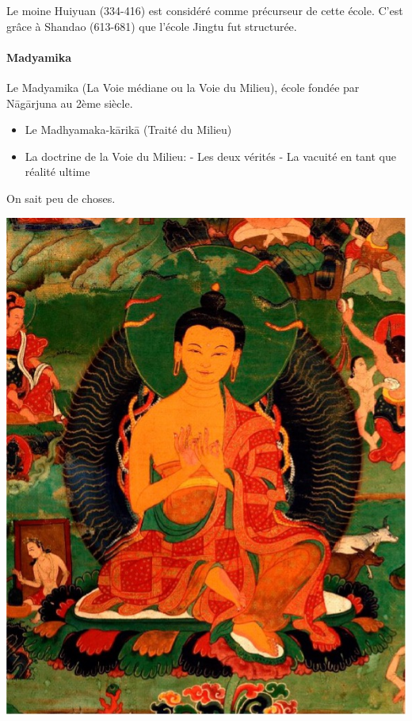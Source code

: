 Le moine Huiyuan (334-416) est considéré comme précurseur de cette école.
C’est grâce à Shandao (613-681) que l’école Jingtu fut structurée.

\paragraph{Madyamika}
Le Madyamika (La Voie médiane ou la
Voie du Milieu), école fondée par
Nāgārjuna au 2ème siècle.
\begin{itemize}
    \item Le Madhyamaka-kārikā (Traité du Milieu)
    \item La doctrine de la Voie du Milieu:
- Les deux vérités
- La vacuité en tant que réalité ultime
\end{itemize}


On sait peu de choses. 
\begin{marginfigure}
    \centering
    \includegraphics[width=\textwidth]{ConfucianismeTaoismeBouddhismeChinois/Images/BouddhaMadyamilka.jpg}
    \label{fig:enter-label}
\end{marginfigure}

